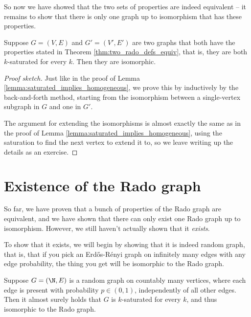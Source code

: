 \documentclass[nobib]{tufte-handout}
\begin{document}
So now we have showed that the two sets of properties are indeed equivalent -- it remains to show that there is only one graph up to isomorphism that has these properties.

\begin{lemma}
    Suppose $G = (V,E)$ and $G' = (V',E')$ are two graphs that both have the properties stated in Theorem \ref{thm:two_rado_defs_equiv}, that is, they are both $k$-saturated for every $k$. Then they are isomorphic.

    \begin{proof}[Proof sketch]
        Just like in the proof of Lemma \ref{lemma:saturated_implies_homogeneous}, we prove this by inductively by the back-and-forth method, starting from the isomorphism between a single-vertex subgraph in $G$ and one in $G'$.

        The argument for extending the isomorphisms is almost exactly the same as in the proof of Lemma \ref{lemma:saturated_implies_homogeneous}, using the saturation to find the next vertex to extend it to, so we leave writing up the details as an exercise.
    \end{proof}
\end{lemma}

\section{Existence of the Rado graph}

So far, we have proven that a bunch of properties of the Rado graph are equivalent, and we have shown that there can only exist one Rado graph up to isomorphism. However, we still haven't actually shown that it \emph{exists}.

To show that it exists, we will begin by showing that it is indeed  random graph, that is, that if you pick an Erd\H{o}s-Rényi graph on infinitely many edges with any edge probability, the thing you get will be isomorphic to the Rado graph.

\begin{theorem}\label{thm:random_graph_is_rado}
    Suppose $G = (\N, E)$ is a random graph on countably many vertices, where each edge is present with probability $p \in (0,1)$, independently of all other edges. Then it almost surely holds that $G$ is $k$-saturated for every $k$, and thus isomorphic to the Rado graph.
\end{theorem}
\end{document}
